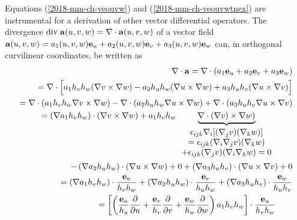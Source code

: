 Equations
(\ref{2018-mm-ch-veouvw})
 and
(\ref{2018-mm-ch-veouvwtnex})
are instrumental for a derivation of other vector differential operators.
The divergence $\text{div}\;{\bf a}(u,v,w) = \nabla \cdot {\bf a}(u,v,w)$  of a vector field
${\bf a}(u,v,w) =
a_1(u,v,w) {\bf e}_u +
a_2(u,v,w) {\bf e}_v +
a_3(u,v,w) {\bf e}_w$ can,
in orthogonal curvilinear coordinates,
be written as
\begin{equation}
\begin{split}
\nabla \cdot {\bf a}
=
\nabla \cdot \left(
a_1  {\bf e}_u +
a_2  {\bf e}_v +
a_3  {\bf e}_w
\right)
\\ =
\nabla \cdot \Big[
a_1   h_v h_w ( \nabla  v \times \nabla  w ) -
a_2   h_u h_w ( \nabla  u \times \nabla  w ) +
a_3   h_u h_v ( \nabla  u \times \nabla  v )
\Big]
\\ =
\nabla \cdot \left(a_1   h_v h_w   \nabla  v \times \nabla  w \right) -
\nabla \cdot \left(a_2   h_u h_w   \nabla  u \times \nabla  w \right) +
\nabla \cdot \left(a_3   h_u h_v   \nabla  u \times \nabla  v \right)
\\ =
\left(\nabla a_1 h_v h_w\right) \cdot    \left(\nabla  v \times \nabla  w \right)  +
a_1 h_v h_w   \underbrace{\nabla \cdot  ( \nabla  v) \times \nabla  w ) }_{\begin{array}{c}
\epsilon_{ijk} \nabla_i [(\nabla_j v) (\nabla_k w)]\\=
\epsilon_{ijk} (\nabla_i \nabla_j v) (\nabla_k w)\\+
\epsilon_{ijk} (\nabla_j v) (\nabla_i \nabla_k w)=0
\end{array}
}
\qquad
\\
- \left(\nabla a_2 h_u h_w\right) \cdot    \left(\nabla  u \times \nabla  w \right)  + 0
+ \left(\nabla a_3 h_u h_v\right) \cdot    \left(\nabla  u \times \nabla  v \right)  + 0
\\ =
  \left(\nabla a_1 h_v h_w\right) \cdot    \frac{ {\bf e}_u}{h_v h_w}
+ \left(\nabla a_2 h_u h_w\right) \cdot    \frac{ {\bf e}_v}{h_u h_w}
+ \left(\nabla a_3 h_u h_v\right) \cdot    \frac{ {\bf e}_w}{h_u h_v}
\\ =
  \left[\left(
\frac{{\bf e}_u}{h_u}  \frac{\partial   }{\partial u}    +
\frac{{\bf e}_v}{h_v}  \frac{\partial   }{\partial v}      +
\frac{{\bf e}_w}{h_w} \frac{\partial   }{\partial w}
\right) a_1 h_v h_w\right] \cdot    \frac{ {\bf e}_u}{h_v h_w}
\qquad
 \\

\end{split}
\end{equation}
